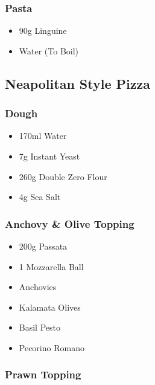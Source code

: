 \documentclass[11pt, english]{article}
\begin{document}
		\subsubsection*{Pasta}

        \begin{itemize}
        \setlength\itemsep{0cm}
                \item 90g Linguine 
                \item Water (To Boil)
        \end{itemize}

\newpage

	\subsection{Neapolitan Style Pizza}

		\subsubsection*{Dough}

	\begin{itemize}
        \setlength\itemsep{0cm}
                \item 170ml Water
		\item 7g Instant Yeast
		\item 260g Double Zero Flour
		\item 4g Sea Salt
        \end{itemize}

		\subsubsection*{Anchovy \& Olive Topping}

	\begin{itemize}
        \setlength\itemsep{0cm}
                \item 200g Passata
		\item 1 Mozzarella Ball
                \item Anchovies
		\item Kalamata Olives
		\item Basil Pesto
		\item Pecorino Romano
        \end{itemize}

		\subsubsection*{Prawn Topping}
\end{document}
